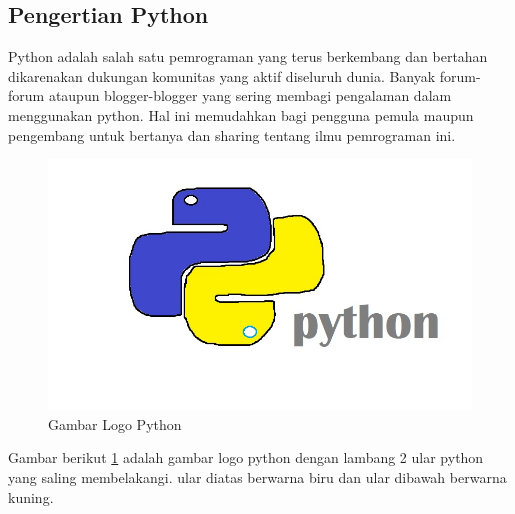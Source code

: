 \subsection{Pengertian Python}
Python adalah salah satu pemrograman yang terus berkembang dan bertahan dikarenakan dukungan komunitas yang aktif diseluruh dunia. Banyak forum-forum ataupun blogger-blogger yang sering membagi pengalaman dalam menggunakan python. Hal ini memudahkan bagi pengguna pemula maupun pengembang untuk bertanya dan sharing tentang ilmu pemrograman ini. 
\begin{figure} [ht]
	\centerline{\includegraphics[width=1\textwidth]{Plagiarisme/logopython.JPG}}
	\caption{Gambar Logo Python}
	\label{logopython}
	\end{figure}
Gambar berikut \ref{logopython} adalah gambar logo python dengan lambang 2 ular python yang saling membelakangi. ular diatas berwarna biru dan ular dibawah berwarna kuning. 

